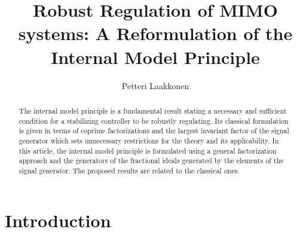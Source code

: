 \documentclass[11pt, a4paper]{amsart}
\begin{document}
\title[A Reformulation of the Internal Model Principle]{Robust Regulation of MIMO systems: A Reformulation of the Internal Model Principle}%


\author{Petteri Laakkonen} 

\address{Laboratory of Mathematics, Tampre University of Technology, PO Box 553, FI-33101 Tampere, Finland (e-mail: petteri.laakkonen@tut.fi).}
\maketitle

\begin{abstract}                %
The internal model principle is a fundamental result stating a necessary and sufficient condition for a stabilizing controller to be robustly regulating. Its classical formulation is given in terms of coprime factorizations and the largest invariant factor of the signal generator which sets unnecessary restrictions for the theory and its applicability. In this article, the internal model principle is formulated using a general factorization approach and the generators of the fractional ideals generated by the elements of the signal generator. The proposed results are related to the classical ones.
\end{abstract}




\section{Introduction}
\end{document}
